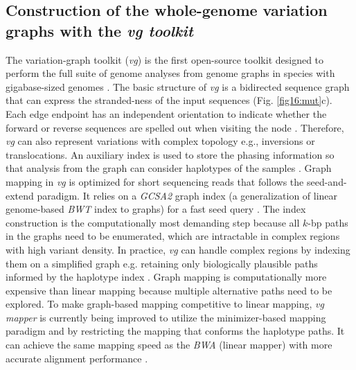 \documentclass[../main.tex]{subfiles}
\begin{document}
\subsection*{Construction of the whole-genome variation graphs with the \emph{vg toolkit}}

The variation-graph toolkit (\emph{vg}) is the first open-source toolkit designed to perform the full suite of genome analyses from genome graphs in species with gigabase-sized genomes \citep{garrison2018variation}. The basic structure of \emph{vg} is a bidirected sequence graph that can express the stranded-ness of the input sequences (Fig. \ref{fig16:mut}c). Each edge endpoint has an independent orientation to indicate whether the forward or reverse sequences are spelled out when visiting the node \citep{paten2017genome}. Therefore, \emph{vg} can also represent variations with complex topology e.g., inversions or translocations. An auxiliary index is used to store the phasing information so that analysis from the graph can consider haplotypes of the samples \citep{siren2020haplotype}. Graph mapping in \emph{vg} is optimized for short sequencing reads that follows the seed-and-extend paradigm. It relies on a \emph{GCSA2 }graph index (a generalization of linear genome-based\emph{ BWT} index to graphs) for a fast seed query \citep{siren2017indexing}. The index construction is the computationally most demanding step because all $k$-bp paths in the graphs need to be enumerated, which are intractable in complex regions with high variant density. In practice, \emph{vg} can handle complex regions by indexing them on a simplified graph e.g. retaining only biologically plausible paths informed by the haplotype index \citep{siren2017indexing}. Graph mapping is computationally more expensive than linear mapping because multiple alternative paths need to be explored. To make graph-based mapping competitive to linear mapping, \emph{vg mapper} is currently being improved to utilize the minimizer-based mapping paradigm and by restricting the mapping that conforms the haplotype paths. It can achieve the same mapping speed as the \emph{BWA} (linear mapper) with more accurate alignment performance \citep{siren2020genotyping}. 
\end{document}
